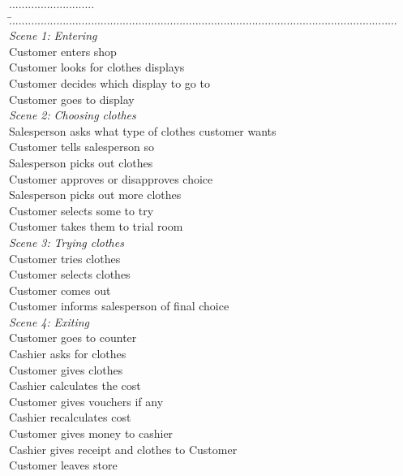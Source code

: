 \documentclass[11pt,a4paper]{article}
\begin{document}
	\begin{tabbing}
		........................... \= ...........................................................................................................................\\
		\textit{Scene 1:}	\> \textit{Entering}\\
			\> Customer enters shop \\
			\> Customer looks for clothes displays \\
 			\> Customer decides which display to go to \\
			\> Customer goes to display \\
			
		\textit{Scene 2:}	\> \textit{Choosing clothes}\\
			\> Salesperson asks what type of clothes customer wants\\
			\> Customer tells salesperson so\\
			\> Salesperson picks out clothes\\
			\> Customer approves or disapproves choice\\
			\> Salesperson picks out more clothes\\
			\> Customer selects some to try\\
			\> Customer takes them to trial room\\

		\textit{Scene 3:}	\> \textit{Trying clothes}\\
			\> Customer tries clothes\\
			\> Customer selects clothes\\
			\> Customer comes out\\
			\> Customer informs salesperson of final choice\\
			
		\textit{Scene 4:}	\> \textit{Exiting}\\
			\> Customer goes to counter\\
			\> Cashier asks for clothes\\
			\> Customer gives clothes\\
			\> Cashier calculates the cost\\
			\> Customer gives vouchers if any\\
			\> Cashier recalculates cost\\
			\> Customer gives money to cashier\\
			\> Cashier gives receipt and clothes to Customer\\
			\> Customer leaves store 

	\end{tabbing}		
	
\end{document}

